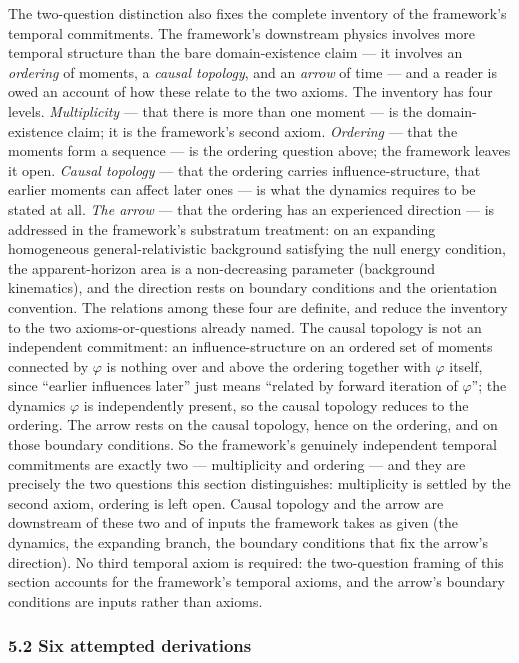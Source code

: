 \documentclass[
]{article}
\begin{document}
The two-question distinction also fixes the complete inventory of the
framework's temporal commitments. The framework's downstream physics
involves more temporal structure than the bare domain-existence claim
--- it involves an \emph{ordering} of moments, a \emph{causal topology},
and an \emph{arrow} of time --- and a reader is owed an account of how
these relate to the two axioms. The inventory has four levels.
\emph{Multiplicity} --- that there is more than one moment --- is the
domain-existence claim; it is the framework's second axiom.
\emph{Ordering} --- that the moments form a sequence --- is the ordering
question above; the framework leaves it open. \emph{Causal topology} ---
that the ordering carries influence-structure, that earlier moments can
affect later ones --- is what the dynamics requires to be stated at all.
\emph{The arrow} --- that the ordering has an experienced direction ---
is addressed in the framework's substratum treatment: on an expanding
homogeneous general-relativistic background satisfying the null energy
condition, the apparent-horizon area is a non-decreasing parameter
(background kinematics), and the direction rests on boundary conditions
and the orientation convention. The relations among these four are
definite, and reduce the inventory to the two axioms-or-questions
already named. The causal topology is not an independent commitment: an
influence-structure on an ordered set of moments connected by
\(\varphi\) is nothing over and above the ordering together with
\(\varphi\) itself, since ``earlier influences later'' just means
``related by forward iteration of \(\varphi\)''; the dynamics
\(\varphi\) is independently present, so the causal topology reduces to
the ordering. The arrow rests on the causal topology, hence on the
ordering, and on those boundary conditions. So the framework's genuinely
independent temporal commitments are exactly two --- multiplicity and
ordering --- and they are precisely the two questions this section
distinguishes: multiplicity is settled by the second axiom, ordering is
left open. Causal topology and the arrow are downstream of these two and
of inputs the framework takes as given (the dynamics, the expanding
branch, the boundary conditions that fix the arrow's direction). No
third temporal axiom is required: the two-question framing of this
section accounts for the framework's temporal axioms, and the arrow's
boundary conditions are inputs rather than axioms.

\hypertarget{six-attempted-derivations}{%
\subsubsection{5.2 Six attempted
derivations}\label{six-attempted-derivations}}
\end{document}
